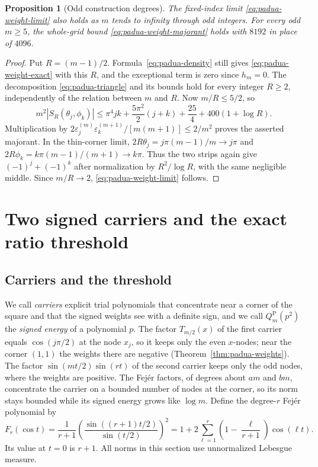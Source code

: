 \documentclass[preprint,12pt,a4paper]{elsarticle}
\newtheorem{proposition}[theorem]{Proposition}
\theoremstyle{remark}
\newcommand{\Pa}{\mathrm P}
\begin{document}
\begin{proposition}[Odd construction degrees]\label{prop:padua-odd-weights}
The fixed-index limit \eqref{eq:padua-weight-limit} also holds as $m$
tends to infinity through odd integers. For every odd $m\ge5$, the
whole-grid bound \eqref{eq:padua-weight-majorant} holds with $8192$
in place of $4096$.
\end{proposition}
\begin{proof}
Put $R=(m-1)/2$. Formula~\eqref{eq:padua-density} still gives
\eqref{eq:padua-weight-exact} with this $R$, and the exceptional term
is zero since $h_m=0$. The decomposition
\eqref{eq:padua-triangle} and its bounds hold for every integer $R\ge2$,
independently of the relation between $m$ and $R$. Now $m/R\le5/2$,
so
\[
 m^2|S_R(\theta_j,\phi_k)|\le\pi^4jk+
 \frac{5\pi^2}2(j+k)+\frac{25}4+400(1+\log R).
\]
Multiplication by $2\varepsilon^{(m)}_j\varepsilon^{(m+1)}_k/[m(m+1)]\le2/m^2$
proves the asserted majorant. In the thin-corner limit,
$2R\theta_j=j\pi(m-1)/m\to j\pi$ and
$2R\phi_k=k\pi(m-1)/(m+1)\to k\pi$.
Thus the two strips again give $(-1)^j+(-1)^k$ after normalization
by $R^2/\log R$, with the same negligible middle. Since
$m/R\to2$, \eqref{eq:padua-weight-limit} follows.
\end{proof}

\section{Two signed carriers and the exact ratio threshold}\label{sec:carriers}

\subsection{Carriers and the threshold}
We call \emph{carriers} explicit trial polynomials that concentrate near a
corner of the square and that the signed weights see with a definite sign, and
we call $Q_m^\Pa(p^2)$ the \emph{signed energy} of a polynomial $p$. The factor
$T_{m/2}(x)$ of the first carrier equals $\cos(j\pi/2)$ at the node $x_j$, so it
keeps only the even $x$-nodes; near the corner $(1,1)$ the weights there are
negative (Theorem~\ref{thm:padua-weights}). The factor $\sin(mt/2)\sin(rt)$ of
the second carrier keeps only the odd nodes, where the weights are positive. The
Fej\'er factors, of degrees about $am$ and $bm$, concentrate the carrier on a
bounded number of nodes at the corner, so its norm stays bounded while its signed
energy grows like $\log m$. Define the degree-$r$ Fej\'er polynomial by
\begin{equation}\label{eq:padua-fejer}
 F_r(\cos t)=\frac1{r+1}
  \left(\frac{\sin((r+1)t/2)}{\sin(t/2)}\right)^2
 =1+2\sum_{\ell=1}^r\left(1-\frac\ell{r+1}\right)\cos(\ell t).
\end{equation}
Its value at $t=0$ is $r+1$. All norms in this section use
unnormalized Lebesgue measure.
\end{document}
